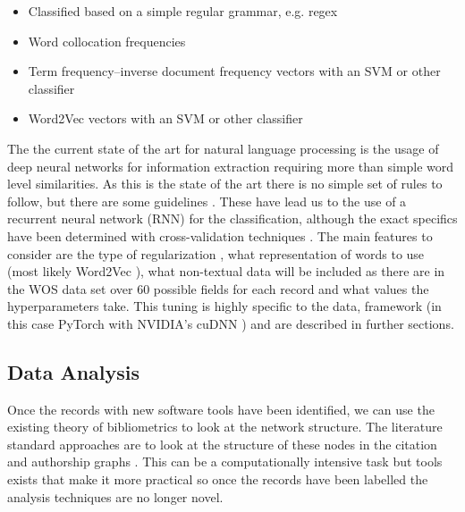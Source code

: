 \documentclass[12pt, a4paper]{article}
\begin{document}
\begin{itemize}
\item Classified based on a simple regular grammar, e.g. regex
\item Word collocation frequencies \citep{manning1999foundations}
\item Term frequency–inverse document frequency vectors with an SVM or other classifier \citep{collobert2011natural}
\item Word2Vec vectors with an SVM or other classifier\citep{mikolov2013distributed}\citep{collobert2011natural}
\end{itemize}

The the current state of the art for natural language processing is the usage of deep neural networks for information extraction requiring more than simple word level similarities\citep{manning-EtAl}. As this is the state of the art there is no simple set of rules to follow, but there are some guidelines \citep{Goodfellow-et-al-2016}. These have lead us to the use of a recurrent neural network (RNN) \citep{mikolov2010recurrent} for the classification, although the exact specifics have been determined with cross-validation techniques \citep{james2013introduction}. The main features to consider are the type of regularization \citep{Goodfellow-et-al-2016}, what representation of words to use (most likely Word2Vec \citep{mikolov2013distributed}), what non-textual data will be included as there are in the WOS data set over 60 possible fields for each record \citep{mkdocs} and what values the hyperparameters take\citep{Goodfellow-et-al-2016}. This tuning is highly specific to the data, framework (in this case PyTorch \citep{pytorch} with NVIDIA's cuDNN \citep{chetlur2014cudnn}) and are described in further sections.

\subsection{Data Analysis}

Once the records with new software tools have been identified, we can use the existing theory of bibliometrics to look at the network structure. The literature standard approaches are to look at the structure of these nodes in the citation and authorship graphs \citep{de2002pattern}\citep{lariviere2006canadian}\citep{borgatti2009network}. This can be a computationally intensive task but tools exists that make it more practical \citep{mclevey2017introducing} so once the records have been labelled the analysis techniques are no longer novel.
\end{document}
